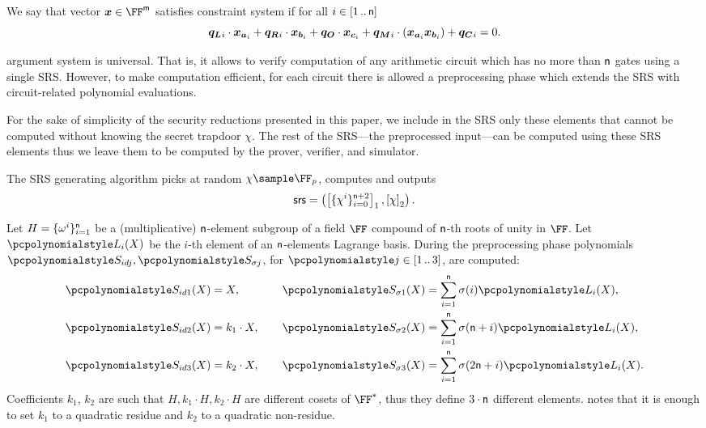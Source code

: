 We say that vector $\vx \in \FF^\noofw$ satisfies constraint system if for all $i
\in [1 \, .. \, \mathsf{n}]$
\[
  \vql_i \cdot \vx_{\va_i} + \vqr_i \cdot \vx_{\vb_i} + \vqo \cdot \vx_{\vc_i} +
  \vqm_i \cdot (\vx_{\va_i} \vx_{\vb_i}) + \vqc_i = 0. 
\]

\label{sec:plonk_explained}
\plonk{} argument system is universal. That is, it allows to verify computation
of any arithmetic circuit which has no more than $\mathsf{n}$
gates using a single SRS. However, to make computation efficient, for each
circuit there is allowed a preprocessing phase which extends the SRS with
circuit-related polynomial evaluations.

For the sake of simplicity of the security reductions presented in this paper, we
include in the SRS only these elements that cannot be computed without knowing
the secret trapdoor $\chi$. The rest of the SRS---the preprocessed input---can
be computed using these SRS elements thus we leave them to be computed by the
prover, verifier, and simulator.

The SRS generating algorithm picks at random $\chi \sample \FF_p$, computes
and outputs
\[
	\mathsf{srs} = \left(\left[\{\chi^i\}_{i = 0}^{\mathsf{n} + 2}\right]_{1},
	\left[\chi\right]_{2} \right).
\]

Let $H = \{\omega^i\}_{i = 1}^{\mathsf{n} }$ be a
(multiplicative) $\mathsf{n}$-element subgroup of a field $\FF$
compound of $\mathsf{n}$-th roots of unity in $\FF$. Let $\lag_i(X)$ be
the $i$-th element of an $\mathsf{n}$-elements Lagrange basis. During
the preprocessing phase polynomials $\p{S_{id j}}, \p{S_{\sigma j}}$, for
$\p{j} \in \range{1}{3}$, are computed:
\begin{equation*}
  \begin{aligned}
    \p{S_{id 1}}(X) & = X,\vphantom{\sum_{i = 1}^{\noofc} \sigma(i) \lag_i(X),}\\
    \p{S_{id 2}}(X) & = k_1 \cdot X,\vphantom{\sum_{i = 1}^{\noofc} \sigma(i) \lag_i(X),}\\
    \p{S_{id 3}}(X) & = k_2 \cdot X,\vphantom{\sum_{i = 1}^{\noofc} \sigma(i) \lag_i(X),}
  \end{aligned}
  \qquad
\begin{aligned}
  \p{S_{\sigma 1}}(X) & = \sum_{i = 1}^{\noofc} \sigma(i) \lag_i(X),\\
  \p{S_{\sigma 2}}(X) & = \sum_{i = 1}^{\noofc}
  \sigma(\noofc + i) \lag_i(X),\\
  \p{S_{\sigma 3}}(X) & =\sum_{i = 1}^{\noofc} \sigma(2 \noofc + i) \lag_i(X).
\end{aligned}
\end{equation*}
Coefficients $k_1$, $k_2$ are such that $H, k_1 \cdot H, k_2 \cdot H$ are
different cosets of $\FF^*$, thus they define $3 \cdot \mathsf{n}$
different elements. \cite{EPRINT:GabWilCio19} notes that it is enough to set
$k_1$ to a quadratic residue and $k_2$ to a quadratic non-residue.

